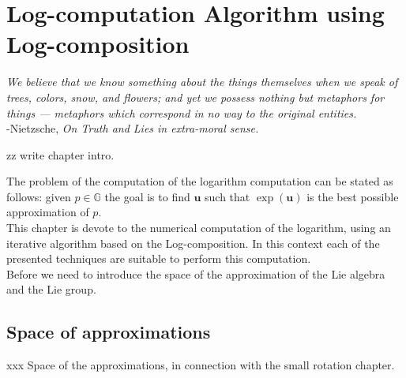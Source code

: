 \chapter{Log-computation Algorithm using Log-composition}\label{ch:log_computations}

\begin{flushright}
	\emph{We believe that we know something about the things themselves when we speak of trees, colors, snow, and flowers; and yet we possess nothing but metaphors for things — metaphors which correspond in no way to the original entities.} \\ -Nietzsche, \emph{On Truth and Lies in extra-moral sense.}
\end{flushright}

zz write chapter intro.


The problem of the computation of the logarithm computation can be stated as follows:
given $p \in \mathbb{G}$ the goal is to find $\mathbf{u}$ such that $\exp(\mathbf{u})$ is the best possible approximation of $p$.  \\
This chapter is devote to the numerical computation of the logarithm, using an iterative algorithm based on the Log-composition. In this context each of the presented techniques are suitable to perform this computation.\\

Before we need to introduce the space of the approximation of the Lie algebra and the Lie group.


\section{Space of approximations}

\noindent
xxx Space of the approximations, in connection with the small rotation chapter.


